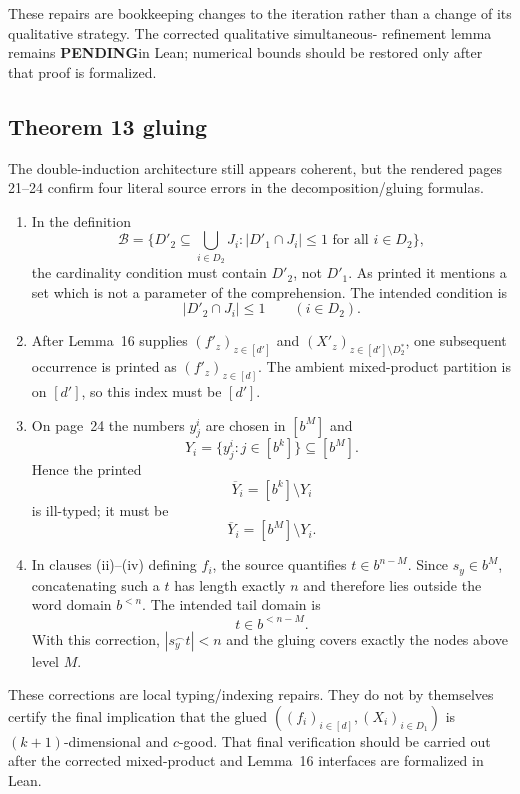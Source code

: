\documentclass[11pt]{article}
\newcommand{\todo}{\textcolor{gray!70!black}{\textbf{PENDING}}}
\begin{document}
These repairs are bookkeeping changes to the iteration rather than a change
of its qualitative strategy.  The corrected qualitative simultaneous-
refinement lemma remains \todo in Lean; numerical bounds should be restored
only after that proof is formalized.

\subsection{Theorem 13 gluing}
The double-induction architecture still appears coherent, but the rendered
pages 21--24 confirm four literal source errors in the decomposition/gluing
formulas.

\begin{enumerate}[label=(\alph*)]
\item In the definition
\[
\mathcal B
 = \{D'_2\subseteq \bigcup_{i\in D_2}J_i:
       |D'_1\cap J_i|\le1\text{ for all }i\in D_2\},
\]
the cardinality condition must contain $D'_2$, not $D'_1$.  As printed it
mentions a set which is not a parameter of the comprehension.  The intended
condition is
\[
|D'_2\cap J_i|\le1\qquad(i\in D_2).
\]

\item After Lemma~16 supplies
$(f'_z)_{z\in[d']}$ and
$(X'_z)_{z\in[d']\setminus D_2^*}$, one subsequent occurrence is printed as
$(f'_z)_{z\in[d]}$.  The ambient mixed-product partition is on $[d']$, so this
index must be $[d']$.

\item On page~24 the numbers $y^i_j$ are chosen in $[b^M]$ and
\[
Y_i=\{y^i_j:j\in[b^k]\}\subseteq[b^M].
\]
Hence the printed
\[
\overline Y_i=[b^k]\setminus Y_i
\]
is ill-typed; it must be
\[
\overline Y_i=[b^M]\setminus Y_i.
\]

\item In clauses (ii)--(iv) defining $f_i$, the source quantifies
$t\in b^{n-M}$.  Since $s_y\in b^M$, concatenating such a $t$ has length
exactly $n$ and therefore lies outside the word domain $b^{<n}$.  The intended
tail domain is
\[
t\in b^{<n-M}.
\]
With this correction, $|s_y^\frown t|<n$ and the gluing covers exactly the
nodes above level $M$.
\end{enumerate}

These corrections are local typing/indexing repairs.  They do not by
themselves certify the final implication that the glued
$((f_i)_{i\in[d]},(X_i)_{i\in D_1})$ is $(k+1)$-dimensional and $c$-good.
That final verification should be carried out after the corrected mixed-product
and Lemma~16 interfaces are formalized in Lean.
\end{document}

